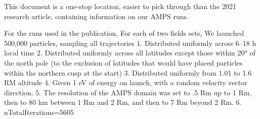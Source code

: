 This document is a one-stop location, easier to pick through than the 2021 research article, containing information on our AMPS runs.

For the runs used in the publication, 
For each of two fields sets, 
We launched 500,000 particles, sampling all trajectories
1. Distributed uniformly across 6–18 h local time
2. Distributed uniformly across all latitudes except those within 20° of the north pole (to the exclusion of latitudes that would have placed particles within the northern cusp at the start)
3. Distributed uniformly from 1.01 to 1.6 RM altitude
4. Given 1 eV of energy on launch, with a random velocity vector direction.
5. The resolution of the AMPS domain was set to .5 Rm up to 1 Rm, then to 80 km between 1 Rm and 2 Rm, and then to 7 Rm beyond 2 Rm.
6. nTotalIterations=5605

